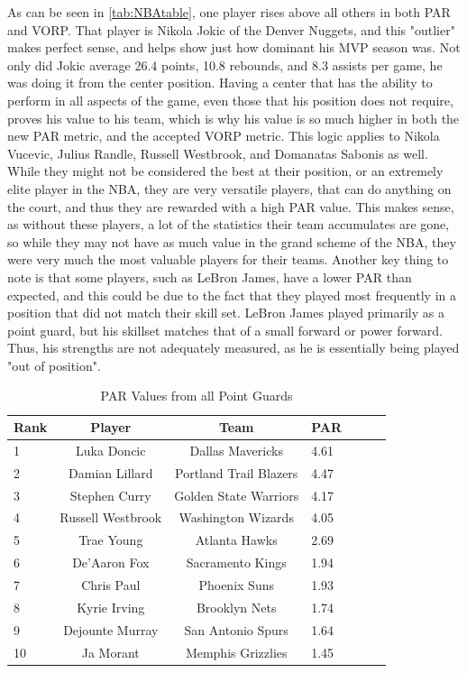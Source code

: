 \documentclass[12pt]{article}
\begin{document}
As can be seen in \ref{tab:NBAtable}, one player rises above all others in 
both PAR and VORP. 
That player is Nikola Jokic of the 
Denver Nuggets, and this "outlier" makes perfect sense, and helps show 
just how dominant his MVP 
season was. Not only did Jokic average 26.4 points, 10.8 rebounds, and 
8.3 assists per game, he was 
doing it from the center position. Having a center that has the ability to 
perform in all aspects of the game, 
even those that his position does not require, proves his value to his 
team, which is why his value is so 
much higher in both the new PAR metric, and the accepted VORP metric. 
This logic applies to Nikola 
Vucevic, Julius Randle, Russell Westbrook, and Domanatas Sabonis as 
well. While they might not be 
considered the best at their position, or an extremely elite player in the 
NBA, they are very versatile players, 
that can do anything on the court, and thus they are rewarded with a high 
PAR value. This makes sense, as 
without these players, a lot of the statistics their team accumulates are 
gone, so while they may not have as 
much value in the grand scheme of the NBA, they were very much the 
most valuable players for their 
teams. Another key thing to note is that some players, such as LeBron 
James, have a lower PAR than 
expected, and this could be due to the fact that they played most 
frequently in a position that did not match 
their skill set. LeBron James played primarily as a point guard, but his 
skillset matches that of a small 
forward or power forward. Thus, his strengths are not adequately 
measured, as he is essentially being 
played "out of position".

\begin{table}[tbp]
  \caption{PAR Values from all Point Guards}
  \label{tab:PGtable}
\centering
\begin{tabular}[t]{lccllll}
  \toprule
  Rank & Player & Team & PAR\\
  \midrule
 1 & Luka Doncic & Dallas Mavericks & 4.61\\
 2 & Damian Lillard & Portland Trail Blazers & 4.47\\
 3 & Stephen Curry & Golden State Warriors & 4.17\\
 4 & Russell Westbrook & Washington Wizards & 4.05\\
 5 & Trae Young & Atlanta Hawks & 2.69\\
 6 & De'Aaron Fox & Sacramento Kings & 1.94\\
 7 & Chris Paul & Phoenix Suns & 1.93\\
 8 & Kyrie Irving & Brooklyn Nets & 1.74\\
 9 & Dejounte Murray & San Antonio Spurs & 1.64\\
 10 & Ja Morant & Memphis Grizzlies & 1.45\\
  \bottomrule
\end{tabular}
\end{table}
\end{document}
